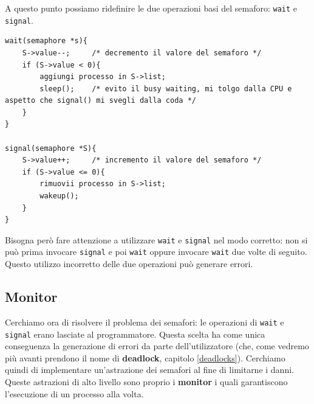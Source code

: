 A questo punto possiamo ridefinire le due operazioni basi del semaforo: \texttt{wait} e \texttt{signal}.
\begin{lstlisting}[caption={Utilizzo di semaforo con \textit{waiting queue}}]
wait(semaphore *s){
    S->value--;     /* decremento il valore del semaforo */
    if (S->value < 0){
        aggiungi processo in S->list;
        sleep();    /* evito il busy waiting, mi tolgo dalla CPU e aspetto che signal() mi svegli dalla coda */
    }
}

signal(semaphore *S){
    S->value++;     /* incremento il valore del semaforo */
    if (S->value <= 0){
        rimuovii processo in S->list;
        wakeup();
    }
}
\end{lstlisting}

Bisogna però fare attenzione a utilizzare \texttt{wait} e \texttt{signal} nel modo corretto: non si può prima invocare \texttt{signal} e poi \texttt{wait} oppure invocare \texttt{wait} due volte di seguito. Questo utilizzo incorretto delle due operazioni può generare errori.
% 
\subsection{Monitor}
Cerchiamo ora di risolvere il problema dei semafori: le operazioni di \texttt{wait} e \texttt{signal} erano lasciate al programmatore. Questa scelta ha come unica conseguenza la generazione di errori da parte dell'utilizzatore (che, come vedremo più avanti prendono il nome di \textbf{deadlock}, capitolo \ref{deadlocks}). Cerchiamo quindi di implementare un'astrazione dei semafori al fine di limitarne i danni. Queste astrazioni di alto livello sono proprio i \textbf{monitor} i quali garantiscono l'esecuzione di un processo alla volta.

